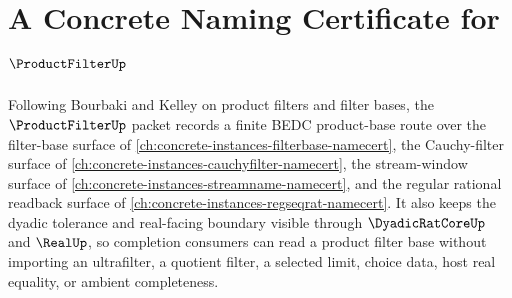 \chapter{A Concrete Naming Certificate for $\ProductFilterUp$}
\label{ch:concrete-instances-product-filter-namecert}

Following Bourbaki and Kelley on product filters and filter bases, the $\ProductFilterUp$ packet records a finite BEDC product-base route over the filter-base surface of \autoref{ch:concrete-instances-filterbase-namecert}, the Cauchy-filter surface of \autoref{ch:concrete-instances-cauchyfilter-namecert}, the stream-window surface of \autoref{ch:concrete-instances-streamname-namecert}, and the regular rational readback surface of \autoref{ch:concrete-instances-regseqrat-namecert}. It also keeps the dyadic tolerance and real-facing boundary visible through $\DyadicRatCoreUp$ and $\RealUp$, so completion consumers can read a product filter base without importing an ultrafilter, a quotient filter, a selected limit, choice data, host real equality, or ambient completeness.


